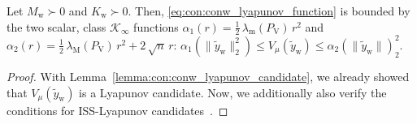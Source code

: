 \begin{lemma}\label{lemma:con:iss_lyapunov_bounds}
    Let $M_\mathrm{w} \succ 0$ and $K_\mathrm{w} \succ 0$. Then, \eqref{eq:con:conw_lyapunov_function} is bounded by the two scalar, class $\mathcal{K}_\infty$ functions $\alpha_1(r)=\frac{1}{2} \, \lambda_\mathrm{m}(P_\mathrm{V})  \, r^2$ and $\alpha_2(r)=\frac{1}{2} \, \lambda_\mathrm{M}(P_\mathrm{V}) \, r^2 + 2 \, \sqrt{n} \, r$: $ \alpha_1(\lVert \tilde{y}_\mathrm{w} \rVert_2^2) \leq V_\mu(\tilde{y}_\mathrm{w}) \leq \alpha_2(\lVert \tilde{y}_\mathrm{w} \rVert)_2^2$.
\end{lemma}
\begin{proof}
    With Lemma~\ref{lemma:con:conw_lyapunov_candidate}, we already showed that  $V_\mu(\tilde{y}_\mathrm{w})$ is a Lyapunov candidate. Now, we additionally also verify the conditions for ISS-Lyapunov candidates~\cite{khalil2002nonlinear}.


\end{proof}
